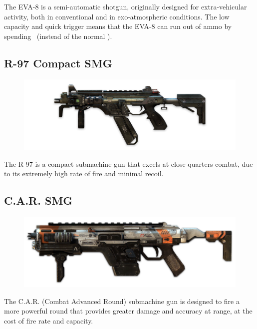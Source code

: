 \documentclass[9pt, openany]{extbook}
\begin{document}
The EVA-8 is a semi-automatic shotgun, originally designed for extra-vehicular activity, both in conventional and in exo-atmospheric conditions. The low capacity and quick trigger means that the EVA-8 can run out of ammo by spending \Threat\Threat\Threat\ (instead of the normal \Despair).

\subsection{R-97 Compact SMG}
\begin{figure}
\vspace*{-2em}
\includegraphics[width=\linewidth]{R97CompactSMG}
\end{figure}

The R-97 is a compact submachine gun that excels at close-quarters combat, due to its extremely high rate of fire and minimal recoil.

\subsection{C.A.R. SMG}
\begin{figure}
\vspace*{-2em}
\includegraphics[width=\linewidth]{CARSMG}
\end{figure}

The C.A.R. (Combat Advanced Round) submachine gun is designed to fire a more powerful round that provides greater damage and accuracy at range, at the cost of fire rate and capacity.
\end{document}
